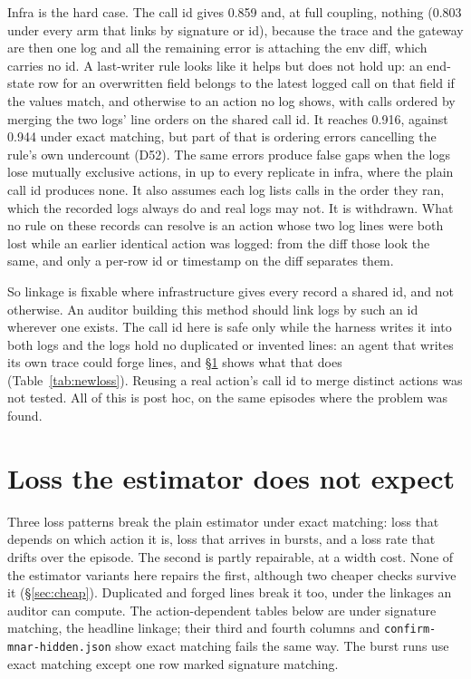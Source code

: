 \documentclass[11pt]{article}
\begin{document}
Infra is the hard case. The call id gives 0.859 and, at full coupling, nothing
(0.803 under every arm that links by signature or id), because the trace and the
gateway are then one log and all the remaining error is attaching the env diff,
which carries no id. A last-writer rule looks like it helps but does not hold
up: an end-state row for an overwritten field belongs to the latest logged call on
that field if the values match, and otherwise to an action no log shows, with
calls ordered by merging the two logs' line orders on the shared call id. It
reaches 0.916, against 0.944 under exact matching, but part of that is ordering
errors cancelling the rule's own undercount (D52). The same errors produce false
gaps when the logs lose mutually exclusive actions, in up to every replicate in
infra, where the plain call id produces none. It also assumes each log lists calls
in the order they ran, which the recorded logs always do and real logs may not. It
is withdrawn. What no rule
on these records can resolve is an action whose two log lines were both lost
while an earlier identical action was logged: from the diff those look the same,
and only a per-row id or timestamp on the diff separates them.

So linkage is fixable where infrastructure gives every record a shared id, and
not otherwise. An auditor building this method should link logs by such an id
wherever one exists. The call id here is safe only while the harness writes it
into both logs and the logs hold no duplicated or invented lines: an agent that
writes its own trace could forge lines, and \S\ref{sec:limit} shows what that does
(Table~\ref{tab:newloss}). Reusing a real action's call id to merge distinct
actions was not tested. All of this is post hoc, on the same episodes where the
problem was found.

\section{Loss the estimator does not expect}
\label{sec:limit}

Three loss patterns break the plain estimator under exact matching: loss that
depends on which action it is, loss that arrives in bursts, and a loss rate that
drifts over the episode. The second is partly repairable, at a width cost. None of
the estimator variants here repairs the first, although two cheaper checks survive
it (\S\ref{sec:cheap}). Duplicated and forged lines break it too, under the
linkages an auditor can compute. The action-dependent tables
below are under signature matching, the headline linkage; their third and fourth columns and
\texttt{confirm-mnar-hidden.json} show exact matching fails the same way. The
burst runs use exact matching except one row marked signature matching.
\end{document}
